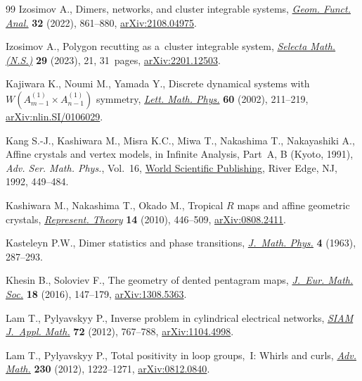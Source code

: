 \documentclass[10pt,a4paper]{amsart}
\numberwithin{equation}{section}
\begin{document}
\begin{thebibliography}{99}
Izosimov A., Dimers, networks, and cluster integrable systems,
 \href{https://doi.org/10.1007/s00039-022-00605-8}{\textit{Geom. Funct.
 Anal.}} \textbf{32} (2022), 861--880,
 \href{http://arxiv.org/abs/2108.04975}{arXiv:2108.04975}.

Izosimov A., Polygon recutting as a~cluster integrable system,
 \href{https://doi.org/10.1007/s00029-023-00826-1}{\textit{Selecta Math.
 (N.S.)}} \textbf{29} (2023), 21, 31~pages,
 \href{http://arxiv.org/abs/2201.12503}{arXiv:2201.12503}.

Kajiwara K., Noumi M., Yamada Y., Discrete dynamical systems with
 {$W(A_{m-1}^{(1)}\times A_{n-1}^{(1)})$} symmetry,
 \href{https://doi.org/10.1023/A:1016298925276}{\textit{Lett. Math. Phys.}}
 \textbf{60} (2002), 211--219,
 \href{http://arxiv.org/abs/nlin.SI/0106029}{arXiv:nlin.SI/0106029}.

Kang S.-J., Kashiwara M., Misra K.C., Miwa T., Nakashima T., Nakayashiki A.,
 Affine crystals and vertex models, in Infinite Analysis, {P}art~{A}, {B}
 ({K}yoto, 1991), \textit{Adv. Ser. Math. Phys.}, Vol.~16,
 \href{https://doi.org/10.1142/s0217751x92003896}{World Scientific Publishing},
 River Edge, NJ, 1992, 449--484.

Kashiwara M., Nakashima T., Okado M., Tropical {$R$} maps and affine geometric
 crystals,
 \href{https://doi.org/10.1090/S1088-4165-2010-00379-9}{\textit{Represent.
 Theory}} \textbf{14} (2010), 446--509,
 \href{http://arxiv.org/abs/0808.2411}{arXiv:0808.2411}.

Kasteleyn P.W., Dimer statistics and phase transitions,
 \href{https://doi.org/10.1063/1.1703953}{\textit{J.~Math. Phys.}} \textbf{4}
 (1963), 287--293.

Khesin B., Soloviev F., The geometry of dented pentagram maps,
 \href{https://doi.org/10.4171/JEMS/586}{\textit{J.~Eur. Math. Soc.}}
 \textbf{18} (2016), 147--179,
 \href{http://arxiv.org/abs/1308.5363}{arXiv:1308.5363}.

Lam T., Pylyavskyy P., Inverse problem in cylindrical electrical networks,
 \href{https://doi.org/10.1137/110846476}{\textit{SIAM J.~Appl. Math.}}
 \textbf{72} (2012), 767--788,
 \href{http://arxiv.org/abs/1104.4998}{arXiv:1104.4998}.

Lam T., Pylyavskyy P., Total positivity in loop groups,~{I}: {W}hirls and
 curls, \href{https://doi.org/10.1016/j.aim.2012.03.012}{\textit{Adv. Math.}}
 \textbf{230} (2012), 1222--1271,
 \href{http://arxiv.org/abs/0812.0840}{arXiv:0812.0840}.


\end{thebibliography}
\end{document}
